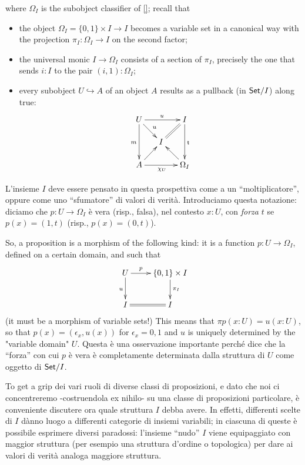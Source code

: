 \documentclass{amsart}
\begin{document}
where $\Omega_I$ is the subobject classifier of \ref{}; recall that
\begin{itemize}
  \item the object $\Omega_I = \{0,1\}\times I \to I$ becomes a variable set in a canonical way with the projection $\pi_I : \Omega_I \to I$ on the second factor;
  \item the universal monic $I \to \Omega_I$ consists of a section of $\pi_I$, precisely the one that sends $i : I$ to the pair $(i,1) : \Omega_I$;
  \item every subobject $U \hookrightarrow A$ of an object $A$ results as a pullback (in $\mathsf{Set}/I$) along true:
        \[\xymatrix@R=5mm@C=5mm{
          U\ar[dr]^u\ar[rr]^u\ar[dd]_m&& I\ar[dd]^{\sf t} \ar@{=}[dl]\\
          &I& \\
          A \ar[ur]\ar[rr]_{\chi_U}&& \ar[ul]\Omega_I
        }\]
\end{itemize}
L'insieme $I$ deve essere pensato in questa prospettiva come a un ``moltiplicatore'', oppure come uno ``sfumatore'' di valori di verità. Introduciamo questa notazione: diciamo che $p : U \to \Omega_I$ è vera (risp., falsa), nel contesto $x :U$, con \emph{forza} $t$ se $p(x) =(1,t)$ (risp., $p(x)=(0,t)$).

So, a proposition is a morphism of the following kind: it is a function $p : U \to \Omega_I$, defined on a certain domain, and such that
\[
\xymatrix{
  U\ar[d]_u\ar[r]^-p  & \{0,1\}\times I \ar[d]^{\pi_I}\\ 
  I \ar@{=}[r]& I
}  
\]
(it must be a morphism of variable sets!) This means that $\pi p(x : U) = u(x : U)$, so that $p(x) = (\epsilon_x, u(x))$ for $\epsilon_x =0,1$ and $u$ is uniquely determined by the "variable domain" $U$. Questa è una osservazione importante perché dice che la ``forza'' con cui $p$ è vera è completamente determinata dalla struttura di $U$ come oggetto di $\mathsf{Set}/I$.

To get a grip dei vari ruoli di diverse classi di proposizioni, e dato che noi ci concentreremo -costruendola ex nihilo- su una classe di proposizioni particolare, è conveniente discutere ora quale struttura $I$ debba avere. In effetti, differenti scelte di $I$ dànno luogo a differenti categorie di insiemi variabili; in ciascuna di queste è possibile esprimere diversi paradossi: l'insieme ``nudo'' $I$  viene equipaggiato con maggior struttura (per esempio una struttura d'ordine o topologica) per dare ai valori di verità analoga maggiore struttura.
\end{document}
